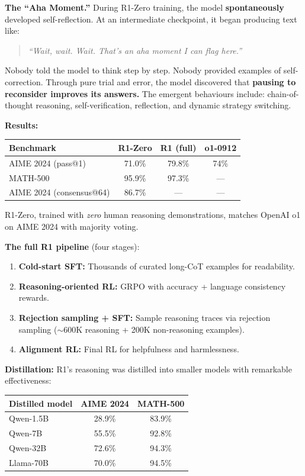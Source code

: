 \documentclass[11pt, a4paper]{article}
\theoremstyle{definition}
\theoremstyle{plain}
\begin{document}
\textbf{The ``Aha Moment.''} During R1-Zero training, the model \textbf{spontaneously} developed self-reflection. At an intermediate checkpoint, it began producing text like:

\begin{quote}
\itshape ``Wait, wait. Wait. That's an aha moment I can flag here.''
\end{quote}

Nobody told the model to think step by step. Nobody provided examples of self-correction. Through pure trial and error, the model discovered that \textbf{pausing to reconsider improves its answers.} The emergent behaviours include: chain-of-thought reasoning, self-verification, reflection, and dynamic strategy switching.

\textbf{Results:}
\begin{center}
\begin{tabular}{lccc}
  \toprule
  \textbf{Benchmark} & \textbf{R1-Zero} & \textbf{R1 (full)} & \textbf{o1-0912} \\
  \midrule
  AIME 2024 (pass@1) & 71.0\% & 79.8\% & 74\% \\
  MATH-500 & 95.9\% & 97.3\% & --- \\
  AIME 2024 (consensus@64) & 86.7\% & --- & --- \\
  \bottomrule
\end{tabular}
\end{center}

R1-Zero, trained with \emph{zero} human reasoning demonstrations, matches OpenAI o1 on AIME 2024 with majority voting.

\textbf{The full R1 pipeline} (four stages):
\begin{enumerate}
  \item \textbf{Cold-start SFT:} Thousands of curated long-CoT examples for readability.
  \item \textbf{Reasoning-oriented RL:} GRPO with accuracy + language consistency rewards.
  \item \textbf{Rejection sampling + SFT:} Sample reasoning traces via rejection sampling (${\sim}$600K reasoning + 200K non-reasoning examples).
  \item \textbf{Alignment RL:} Final RL for helpfulness and harmlessness.
\end{enumerate}

\textbf{Distillation:} R1's reasoning was distilled into smaller models with remarkable effectiveness:
\begin{center}
\begin{tabular}{lcc}
  \toprule
  \textbf{Distilled model} & \textbf{AIME 2024} & \textbf{MATH-500} \\
  \midrule
  Qwen-1.5B & 28.9\% & 83.9\% \\
  Qwen-7B & 55.5\% & 92.8\% \\
  Qwen-32B & 72.6\% & 94.3\% \\
  Llama-70B & 70.0\% & 94.5\% \\
  \bottomrule
\end{tabular}
\end{center}
\end{document}
